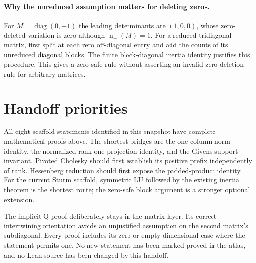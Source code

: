 \documentclass[11pt]{article}
\newcommand{\diag}{\operatorname{diag}}
\newcommand{\negind}{\operatorname{n}_{-}}
\theoremstyle{remark}\newtheorem{remark}[theorem]{Remark}
\numberwithin{equation}{section}
\begin{document}
\paragraph{Why the unreduced assumption matters for deleting zeros.}
For $M=\diag(0,-1)$ the leading determinants are $(1,0,0)$, whose
zero-deleted variation is zero although $\negind(M)=1$. For a reduced
tridiagonal matrix, first split at each zero off-diagonal entry and add
the counts of its unreduced diagonal blocks. The finite block-diagonal
inertia identity justifies this procedure. This gives a zero-safe rule
without asserting an invalid zero-deletion rule for arbitrary matrices.

\section*{Handoff priorities}
All eight scaffold statements identified in this snapshot have complete
mathematical proofs above. The shortest bridges are the one-column norm
identity, the normalized rank-one projection identity, and the Givens
support invariant. Pivoted Cholesky should first establish its positive
prefix independently of rank. Hessenberg reduction should first expose
the padded-product identity. For the current Sturm scaffold, symmetric
LU followed by the existing inertia theorem is the shortest route;
the zero-safe block argument is a stronger optional extension.

The implicit-Q proof deliberately stays in the matrix layer. Its correct
intertwining orientation avoids an unjustified assumption on the second
matrix's subdiagonal. Every proof includes its zero or empty-dimensional
case where the statement permits one. No new statement has been marked
proved in the atlas, and no Lean source has been changed by this handoff.
\end{document}
